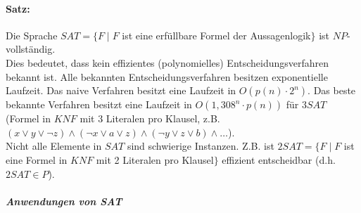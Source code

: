 \paragraph{Satz:} Die Sprache $SAT=\{F\;|\; F$ ist eine erfüllbare Formel der Aussagenlogik$\}$ ist $NP$-vollständig.\\
Dies bedeutet, dass kein effizientes (polynomielles) Entscheidungsverfahren bekannt ist. Alle bekannten Entscheidungsverfahren besitzen exponentielle Laufzeit. Das naive Verfahren besitzt eine Laufzeit in $O(p(n)\cdot 2^n)$. Das beste bekannte Verfahren besitzt eine Laufzeit in $O(1,308^n\cdot p(n))$ für $3 SAT$ (Formel in $KNF$ mit 3 Literalen pro Klausel, z.B. $(x\vee y \vee \neg z ) \wedge (\neg x \vee a \vee z) \wedge (\neg y \vee z \vee b) \wedge \dots$).\\
Nicht alle Elemente in $SAT$ sind schwierige Instanzen. Z.B. ist $2 SAT=\{F\;|\; F$ ist eine Formel in $KNF$ mit 2 Literalen pro Klausel$\}$ effizient entscheidbar (d.h. $2 SAT \in P$).\\
\subparagraph{Anwendungen von SAT} 
